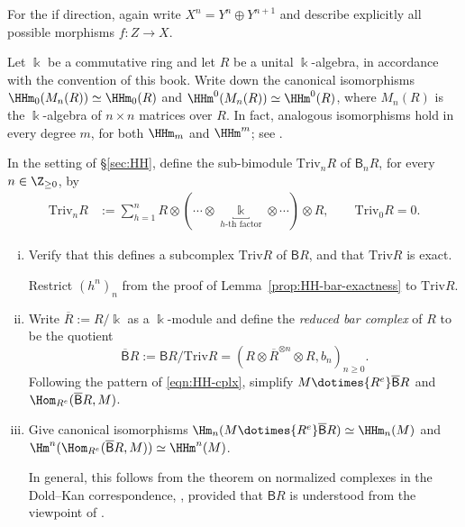 \begin{Exercises}
\begin{hint}
		For the if direction, again write $X^n=Y^n\oplus Y^{n+1}$ and
		describe explicitly all possible morphisms $f:Z\to X$.
	\end{hint}

	\item Let $\Bbbk$ be a commutative ring and let $R$ be a unital
	$\Bbbk$-algebra, in accordance with the convention of this book. Write
	down the canonical isomorphisms
	$\HHm_0(M_n(R))\simeq\HHm_0(R)$ and
	$\HHm^0(M_n(R))\simeq\HHm^0(R)$, where $M_n(R)$ is the
	$\Bbbk$-algebra of $n\times n$ matrices over $R$. In fact, analogous
	isomorphisms hold in every degree $m$, for both $\HHm_m$ and $\HHm^m$;
	see \cite[Theorem~1.2.4]{Lo98}.

	\item In the setting of \S\ref{sec:HH}, define the sub-bimodule
	$\mathrm{Triv}_nR$ of $\mathsf{B}_nR$, for every
	$n\in\Z_{\geq0}$, by
	\begin{align*}
		\mathrm{Triv}_nR
		&:=\sum_{h=1}^n
		R\otimes
		(\cdots\otimes
		\underbracket{\;\Bbbk\;}_{\text{$h$-th factor}}
		\otimes\cdots)\otimes R,
		\qquad \mathrm{Triv}_0R=0.
	\end{align*}
	\begin{enumerate}[(i)]
		\item Verify that this defines a subcomplex $\mathrm{Triv}R$ of
		$\mathsf{B}R$, and that $\mathrm{Triv}R$ is exact.
		\begin{hint}
			Restrict $(h^n)_n$ from the proof of
			Lemma~\ref{prop:HH-bar-exactness} to $\mathrm{Triv}R$.
		\end{hint}
		\item Write $\overline R:=R/\Bbbk$ as a $\Bbbk$-module and define
		the \emph{reduced bar complex} of $R$ to be the quotient
		\[
			\overline{\mathsf{B}}R
			:=\mathsf{B}R/\mathrm{Triv}R
			=\left(R\otimes\overline R^{\otimes n}\otimes R,b_n\right)_{n\geq0}.
		\]
		Following the pattern of \eqref{eqn:HH-cplx}, simplify
		$M\dotimes{R^e}\overline{\mathsf{B}}R$ and
		$\Hom_{R^e}(\overline{\mathsf{B}}R,M)$.
		\item Give canonical isomorphisms
		$\Hm_n(M\dotimes{R^e}\overline{\mathsf{B}}R)\simeq\HHm_n(M)$ and
		$\Hm^n(\Hom_{R^e}(\overline{\mathsf{B}}R,M))\simeq\HHm^n(M)$.
		\begin{hint}
			In general, this follows from the theorem on normalized complexes in
			the Dold--Kan correspondence,
			, provided that
			$\mathsf{B}R$ is understood from the viewpoint of
			.
		\end{hint}
	\end{enumerate}


\end{Exercises}
